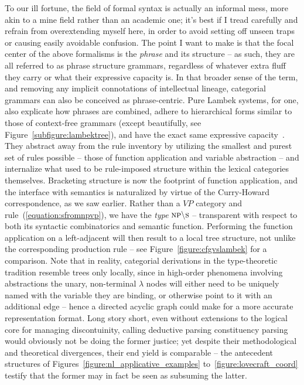 To our ill fortune, the field of formal syntax is actually an informal mess, more akin to a mine field rather than an academic one; it's best if I tread carefully and refrain from overextending myself here, in order to avoid setting off unseen traps or causing easily avoidable confusion.
The point I want to make is that the focal center of the above formalisms is the \textit{phrase} and its structure -- as such, they are all referred to as phrase structure grammars, regardless of whatever extra fluff they carry or what their expressive capacity is.
In that broader sense of the term, and removing any implicit connotations of intellectual lineage, categorial grammars can also be conceived as phrase-centric.
Pure Lambek systems, for one, also explicate how phrases are combined, adhere to hierarchical forms similar to those of context-free grammars (except beautifully, see Figure~\ref{subfigure:lambektree}), and have the exact same expressive capacity~\cite{pentus1993lambek}.
They abstract away from the rule inventory by utilizing the smallest and purest set of rules possible -- those of function application and variable abstraction -- and internalize what used to be rule-imposed structure within the lexical categories themselves.
Bracketing structure is now the footprint of function application, and the interface with semantics is naturalized by virtue of the Curry-Howard correspondence, as we saw earlier.
Rather than a $VP$ category and rule~(\ref{equation:sfromnpvp}), we have the \textit{type} $\np[s]\divleft\s[s]$ -- transparent with respect to both its syntactic combinatorics and semantic function.
Performing the function application on a left-adjacent \np[s] will then result to a local tree structure, not unlike the corresponding production rule -- see Figure~\ref{figure:cfgvslambek} for a comparison.
Note that in reality, categorial derivations in the type-theoretic tradition resemble trees only locally, since in high-order phenomena involving abstractions the unary, non-terminal $\lambda$ nodes will either need to be uniquely named with the variable they are binding, or otherwise point to it  with an additional edge -- hence a directed acyclic graph could make for a more accurate representation format.
Long story short, even without extensions to the logical core for managing discontuinity, calling deductive parsing constituency parsing would obviously not be doing the former justice; yet despite their methodological and theoretical divergences, their end yield is comparable -- the antecedent structures of Figures~\ref{figure:nl_applicative_examples} to~\ref{figure:lovecraft_coord} testify that the former may in fact be seen as subsuming the latter.

